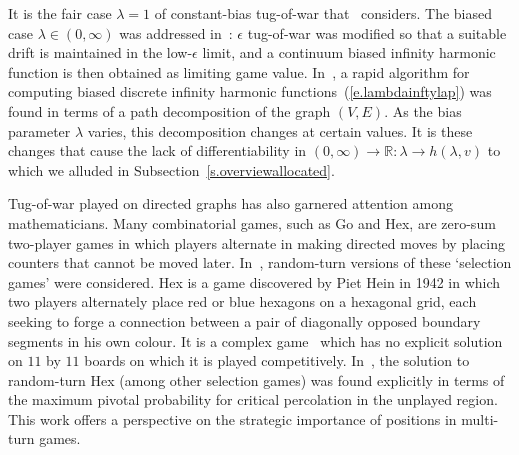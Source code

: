 \documentclass[letterpaper,11pt,oneside,reqno]{amsbook}
\newcommand{\e}[0]{\epsilon}
\newcommand{\R}{\ensuremath{\mathbb{R}}}
\numberwithin{figure}{chapter}
\theoremstyle{definition}
\theoremstyle{definition}
\theoremstyle{definition}
\theoremstyle{definition}
\theoremstyle{definition}
\begin{document}
It is the fair case $\lambda=1$ of constant-bias tug-of-war that~\cite{PSSW09} considers. The biased case $\lambda \in (0,\infty)$ was addressed in~\cite{PPS10}: $\e$ tug-of-war was modified so that a suitable drift is maintained in the low-$\e$ limit, and a continuum biased infinity harmonic function is then obtained as limiting game value.
In~\cite{PeresSunic}, a rapid algorithm for computing biased discrete infinity harmonic functions~(\ref{e.lambdainftylap}) was found in terms of a path decomposition of the graph $(V,E)$.
As the bias parameter $\lambda$ varies, this decomposition changes at certain values. It is these changes that cause the lack of differentiability in $(0,\infty) \to \R: \lambda \to h(\lambda,v)$
to which we alluded in Subsection~\ref{s.overviewallocated}.

Tug-of-war played on directed graphs has also garnered attention among mathematicians. 
Many combinatorial games, such as Go and Hex, are zero-sum two-player games in which players alternate in making directed moves by placing counters that cannot be moved later.
In~\cite{PSSW07}, random-turn versions of these `selection games' were considered. Hex is a game discovered by Piet Hein in 1942 in which two players alternately place red or blue hexagons on a hexagonal grid, each seeking to forge a connection between a pair of diagonally opposed boundary segments in his own colour. It is a complex game~\cite{Hayward} which has no explicit solution on $11$ by $11$ boards on which it is played competitively. In~\cite{PSSW07}, the solution to random-turn Hex (among other selection games) was  found explicitly  in terms of the maximum pivotal probability for critical percolation in the unplayed region. This work offers a perspective on  the strategic importance of positions in multi-turn games. 
\end{document}
